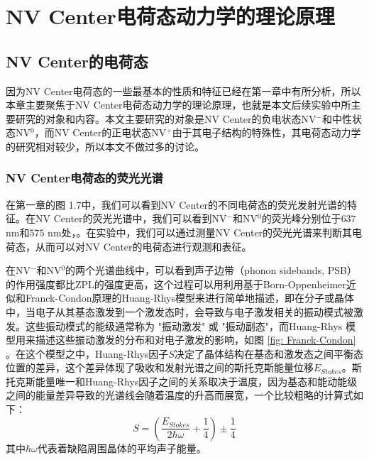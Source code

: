 \documentclass[type = bachelor]{whu-thesis}
\begin{document}

\chapter{NV Center电荷态动力学的理论原理}

\section{NV Center的电荷态}
因为NV Center电荷态的一些最基本的性质和特征已经在第一章中有所分析，所以本章主要聚焦于NV Center电荷态动力学的理论原理，也就是本文后续实验中所主要研究的对象和内容。本文主要研究的对象是NV Center的负电状态NV$^-$和中性状态NV$^0$，而NV Center的正电状态NV$^+$由于其电子结构的特殊性，其电荷态动力学的研究相对较少，所以本文不做过多的讨论\cite{schreyvogel2016active}。

\subsection{NV Center电荷态的荧光光谱}

在第一章的图 1.7中，我们可以看到NV Center的不同电荷态的荧光发射光谱的特征。在NV Center的荧光光谱中，我们可以看到NV$^-$和NV$^0$的荧光峰分别位于$637$ nm和$575$ nm处，。在实验中，我们可以通过测量NV Center的荧光光谱来判断其电荷态，从而可以对NV Center的电荷态进行观测和表征。

在NV$^-$和NV$^0$的两个光谱曲线中，可以看到声子边带（phonon sidebands, PSB）的作用强度都比ZPL的强度更高，这个过程可以用利用基于Born-Oppenheimer近似和Franck-Condon原理的Huang-Rhys模型来进行简单地描述，即在分子或晶体中，当电子从其基态激发到一个激发态时，会导致与电子激发相关的振动模式被激发。这些振动模式的能级通常称为 "振动激发" 或 "振动副态"，而Huang-Rhys 模型用来描述这些振动激发的分布和对电子激发的影响，如图 \ref{fig: Franck-Condon} \cite{zou2023influence}。在这个模型之中，Huang-Rhys因子$S$决定了晶体结构在基态和激发态之间平衡态位置的差异，这个差异体现了吸收和发射光谱之间的斯托克斯能量位移$E_{Stokes}$。斯托克斯能量唯一和Huang-Rhys因子之间的关系取决于温度，因为基态和能动能级之间的能量差异导致的光谱线会随着温度的升高而展宽，一个比较粗略的计算式如下\cite{de2015resolving}： 
\begin{equation}
  S = (\frac{E_{Stokes}}{2\hbar \omega}+\frac{1}{4})±\frac{1}{4}
\end{equation}
其中$\hbar \omega$代表着缺陷周围晶体的平均声子能量。
\end{document}
